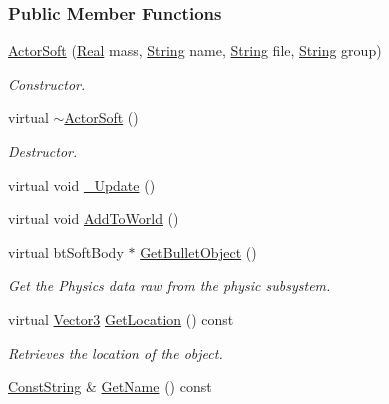 \subsubsection*{Public Member Functions}
\begin{DoxyCompactItemize}
\item 
\hyperlink{classMezzanine_1_1ActorSoft_a3ab7c4cb45c0308a1b398069095d81b2}{ActorSoft} (\hyperlink{namespaceMezzanine_a726731b1a7df72bf3583e4a97282c6f6}{Real} mass, \hyperlink{namespaceMezzanine_acf9fcc130e6ebf08e3d8491aebcf1c86}{String} name, \hyperlink{namespaceMezzanine_acf9fcc130e6ebf08e3d8491aebcf1c86}{String} file, \hyperlink{namespaceMezzanine_acf9fcc130e6ebf08e3d8491aebcf1c86}{String} group)
\begin{DoxyCompactList}\small\item\em Constructor. \item\end{DoxyCompactList}\item 
virtual \hyperlink{classMezzanine_1_1ActorSoft_a4701cb3e90164c828247a43ff098f69b}{$\sim$ActorSoft} ()
\begin{DoxyCompactList}\small\item\em Destructor. \item\end{DoxyCompactList}\item 
virtual void \hyperlink{classMezzanine_1_1ActorSoft_a1f255e52f48a9fec2cfe2f91664fb350}{\_\-Update} ()
\item 
virtual void \hyperlink{classMezzanine_1_1ActorSoft_ad314e449aea1ac0b641816f68a861159}{AddToWorld} ()
\item 
virtual btSoftBody $\ast$ \hyperlink{classMezzanine_1_1ActorSoft_ab0ddf931ccde766dc5e040077f1a3ec4}{GetBulletObject} ()
\begin{DoxyCompactList}\small\item\em Get the Physics data raw from the physic subsystem. \item\end{DoxyCompactList}\item 
virtual \hyperlink{classMezzanine_1_1Vector3}{Vector3} \hyperlink{classMezzanine_1_1ActorSoft_a0192b3889eaf2786352d75ca03fcae4a}{GetLocation} () const 
\begin{DoxyCompactList}\small\item\em Retrieves the location of the object. \item\end{DoxyCompactList}\item 
\hyperlink{namespaceMezzanine_a63cd699ac54b73953f35ec9cfc05e506}{ConstString} \& \hyperlink{classMezzanine_1_1ActorSoft_aa37860ec9b4d12111c74df7bd14fc58d}{GetName} () const 

\end{DoxyCompactItemize}
